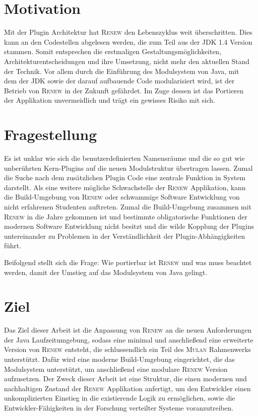 \section{Motivation} \label{sec:motivation}
	Mit der Plugin Architektur hat \textsc{Renew} den Lebenszyklus weit überschritten. Dies kann an den Codestellen abgelesen werden, die zum Teil aus der JDK 1.4 Version stammen. Somit entsprechen die erstmaligen Gestaltungsmöglichkeiten, Architekturentscheidungen und ihre Umsetzung, nicht mehr den aktuellen Stand der Technik. Vor allem durch die Einführung des Modulsystem von Java, mit dem der JDK sowie der darauf aufbauende Code modularisiert wird, ist der Betrieb von \textsc{Renew} in der Zukunft gefährdet. Im Zuge dessen ist das Portieren der Applikation unvermeidlich und trägt ein gewisses Risiko mit sich.

\section{Fragestellung} \label{sec:KdS}
	Es ist unklar wie sich die benutzerdefinierten Namensräume und die so gut wie unberührten Kern-Plugins auf die neuen Modulstruktur übertragen lassen. Zumal die Suche nach dem zusätzlichen Plugin Code eine zentrale Funktion in System darstellt.\newline
	Als eine weitere mögliche Schwachstelle der \textsc{Renew} Applikation, kann die Build-Umgebung von \textsc{Renew} oder schwammige Software Entwicklung von nicht erfahrenen Studenten auftreten. Zumal die Build-Umgebung zusammen mit \textsc{Renew} in die Jahre gekommen ist und bestimmte obligatorische Funktionen der modernen Software Entwicklung nicht besitzt und die wilde Kopplung der Plugins untereinander zu Problemen in der Verständlichkeit der Plugin-Abhängigkeiten führt.\bigbreak

	Beifolgend stellt sich die Frage: Wie portierbar ist \textsc{Renew} und was muss beachtet werden, damit der Umstieg auf das Modulsystem von Java gelingt.

\section{Ziel} \label{sec:Z}

	Das Ziel dieser Arbeit ist die Anpassung von \textsc{Renew} an die neuen Anforderungen der Java Laufzeitumgebung, sodass eine minimal und anschließend eine erweiterte Version von \textsc{Renew} entsteht, die schlussendlich ein Teil des \textsc{Mulan} Rahmenwerks unterstützt. Dafür wird eine moderne Build-Umgebung eingerichtet, die das Modulsystem unterstützt, um anschließend eine modulare \textsc{Renew} Version aufzusetzen. 
	Der Zweck dieser Arbeit ist eine Struktur, die einen modernen und nachhaltigen Zustand der \textsc{Renew} Applikation anfertigt, um den Entwickler einen unkomplizierten Einstieg in die existierende Logik zu ermöglichen, sowie die Entwickler-Fähigkeiten in der Forschung verteilter Systeme voranzutreiben.\bigbreak

